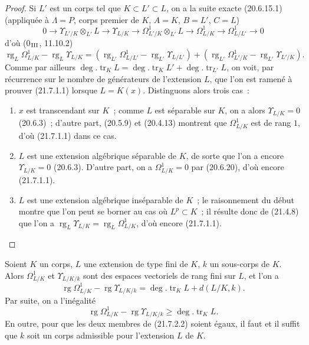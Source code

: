 \begin{proof}
Si $L'$ est un corps tel que $K\subset L'\subset L$, on a la suite exacte
(20.6.15.1) (appliquée à $\Lambda=P$, corps premier de $K$, $A=K$,
$B=L'$, $C=L$)
\[
0\to\Upsilon_{L'/K}\otimes_{L'}L\to\Upsilon_{L/K}
\to\Omega^1_{L'/K}\otimes_{L'}L\to\Omega^1_{L/K}
\to\Omega^1_{L/L'}\to0
\]
d'où (0$_{\rm III}$, 11.10.2)
\[
\operatorname{rg}_L\Omega^1_{L/K}-\operatorname{rg}_L\Upsilon_{L/K}
=(\operatorname{rg}_{L'}\Omega^1_{L/L'}-\operatorname{rg}_{L'}\Upsilon_{L/L'})
+(\operatorname{rg}_{L'}\Omega^1_{L'/K}-\operatorname{rg}_{L'}\Upsilon_{L'/K}).
\]
Comme par ailleurs $\deg.\operatorname{tr}_K L=\deg.\operatorname{tr}_K L'
+\deg.\operatorname{tr}_{L'}L$, on voit, par récurrence sur le nombre de
générateurs de l'extension $L$, que l'on est ramené à prouver (21.7.1.1)
lorsque $L=K(x)$. Distinguons alors trois cas~:
\begin{enumerate}
  \item[\rm a)] $x$ est transcendant sur $K$~; comme $L$ est séparable sur
  $K$, on a alors $\Upsilon_{L/K}=0$ (20.6.3)~; d'autre part, (20.5.9) et
  (20.4.13) montrent que $\Omega^1_{L/K}$ est de rang $1$, d'où
  (21.7.1.1) dans ce cas.
  \item[\rm b)] $L$ est une extension algébrique séparable de $K$, de sorte
  que l'on a encore $\Upsilon_{L/K}=0$ (20.6.3). D'autre part, on a
  $\Omega^1_{L/K}=0$ par (20.6.20), d'où encore (21.7.1.1).
  \item[\rm c)] $L$ est une extension algébrique inséparable de $K$~; le
  raisonnement du début montre que l'on peut se borner au cas où $L^p\subset K$~;
  il résulte donc de (21.4.8) que l'on a
  $\operatorname{rg}_L\Upsilon_{L/K}=\operatorname{rg}_L\Omega^1_{L/K}$,
  d'où encore (21.7.1.1).
\end{enumerate}
\end{proof}

\begin{corollary}[21.7.2]
\label{0.21.7.2-fr}
Soient $K$ un corps, $L$ une extension de type fini de $K$, $k$ un sous-corps
de $K$. Alors $\Omega^1_{L/K}$ et $\Upsilon_{L/K/k}$ sont des espaces
vectoriels de rang fini sur $L$, et l'on a
\begin{equation}
\tag{21.7.2.1}
\label{0.21.7.2.1-fr}
\operatorname{rg}\Omega^1_{L/K}-\operatorname{rg}\Upsilon_{L/K/k}
=\deg.\operatorname{tr}_K L+d(L/K,k).
\end{equation}
Par suite, on a l'inégalité
\begin{equation}
\tag{21.7.2.2}
\label{0.21.7.2.2-fr}
\operatorname{rg}\Omega^1_{L/K}-\operatorname{rg}\Upsilon_{L/K/k}
\geqslant\deg.\operatorname{tr}_K L.
\end{equation}
En outre, pour que les deux membres de (21.7.2.2) soient égaux, il faut et
il suffit que $k$ soit un corps admissible pour l'extension $L$ de $K$.
\end{corollary}

